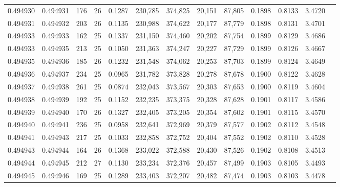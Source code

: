 \begin{tabular}{rrrrrrrrrrrrr}
0.494930 & 0.494931 & 176 &  26 &                                     0.1287 & 230,785 & 374,825 &  20,151 &  87,805 & 0.1898 & 0.8133 & 3.4720 \\
0.494931 & 0.494932 & 203 &  26 &                                     0.1135 & 230,988 & 374,622 &  20,177 &  87,779 & 0.1898 & 0.8131 & 3.4701 \\
0.494933 & 0.494933 & 162 &  25 &                                     0.1337 & 231,150 & 374,460 &  20,202 &  87,754 & 0.1899 & 0.8129 & 3.4686 \\
0.494933 & 0.494935 & 213 &  25 &                                     0.1050 & 231,363 & 374,247 &  20,227 &  87,729 & 0.1899 & 0.8126 & 3.4667 \\
0.494935 & 0.494936 & 185 &  26 &                                     0.1232 & 231,548 & 374,062 &  20,253 &  87,703 & 0.1899 & 0.8124 & 3.4649 \\
0.494936 & 0.494937 & 234 &  25 &                                     0.0965 & 231,782 & 373,828 &  20,278 &  87,678 & 0.1900 & 0.8122 & 3.4628 \\
0.494937 & 0.494938 & 261 &  25 &                                     0.0874 & 232,043 & 373,567 &  20,303 &  87,653 & 0.1900 & 0.8119 & 3.4604 \\
0.494938 & 0.494939 & 192 &  25 &                                     0.1152 & 232,235 & 373,375 &  20,328 &  87,628 & 0.1901 & 0.8117 & 3.4586 \\
0.494939 & 0.494940 & 170 &  26 &                                     0.1327 & 232,405 & 373,205 &  20,354 &  87,602 & 0.1901 & 0.8115 & 3.4570 \\
0.494940 & 0.494941 & 236 &  25 &                                     0.0958 & 232,641 & 372,969 &  20,379 &  87,577 & 0.1902 & 0.8112 & 3.4548 \\
0.494941 & 0.494943 & 217 &  25 &                                     0.1033 & 232,858 & 372,752 &  20,404 &  87,552 & 0.1902 & 0.8110 & 3.4528 \\
0.494943 & 0.494944 & 164 &  26 &                                     0.1368 & 233,022 & 372,588 &  20,430 &  87,526 & 0.1902 & 0.8108 & 3.4513 \\
0.494944 & 0.494945 & 212 &  27 &                                     0.1130 & 233,234 & 372,376 &  20,457 &  87,499 & 0.1903 & 0.8105 & 3.4493 \\
0.494945 & 0.494946 & 169 &  25 &                                     0.1289 & 233,403 & 372,207 &  20,482 &  87,474 & 0.1903 & 0.8103 & 3.4478 \\

\end{tabular}
